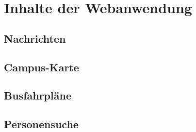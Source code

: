 %
\chapter{Inhalte der Webanwendung}
\label{sec:contents}


\section{Nachrichten}
\label{sec:contents:news}


\section{Campus-Karte}
\label{sec:contents:map}


\section{Busfahrpläne}
\label{sec:contents:bus}


\section{Personensuche}
\label{sec:contents:searchPerson}

